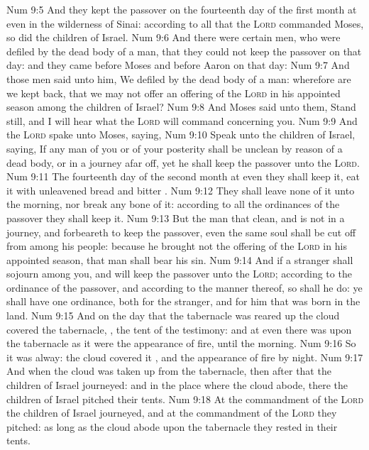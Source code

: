 \vs Num 9:5 And they kept the passover on the fourteenth day of the first month at even in the wilderness of Sinai: according to all that the \textsc{Lord} commanded Moses, so did the children of Israel.
\vs Num 9:6 And there were certain men, who were defiled by the dead body of a man, that they could not keep the passover on that day: and they came before Moses and before Aaron on that day:
\vs Num 9:7 And those men said unto him, We  defiled by the dead body of a man: wherefore are we kept back, that we may not offer an offering of the \textsc{Lord} in his appointed season among the children of Israel?
\vs Num 9:8 And Moses said unto them, Stand still, and I will hear what the \textsc{Lord} will command concerning you.
\vs Num 9:9 And the \textsc{Lord} spake unto Moses, saying,
\vs Num 9:10 Speak unto the children of Israel, saying, If any man of you or of your posterity shall be unclean by reason of a dead body, or  in a journey afar off, yet he shall keep the passover unto the \textsc{Lord}.
\vs Num 9:11 The fourteenth day of the second month at even they shall keep it,  eat it with unleavened bread and bitter .
\vs Num 9:12 They shall leave none of it unto the morning, nor break any bone of it: according to all the ordinances of the passover they shall keep it.
\vs Num 9:13 But the man that  clean, and is not in a journey, and forbeareth to keep the passover, even the same soul shall be cut off from among his people: because he brought not the offering of the \textsc{Lord} in his appointed season, that man shall bear his sin.
\vs Num 9:14 And if a stranger shall sojourn among you, and will keep the passover unto the \textsc{Lord}; according to the ordinance of the passover, and according to the manner thereof, so shall he do: ye shall have one ordinance, both for the stranger, and for him that was born in the land.
\vs Num 9:15 And on the day that the tabernacle was reared up the cloud covered the tabernacle, , the tent of the testimony: and at even there was upon the tabernacle as it were the appearance of fire, until the morning.
\vs Num 9:16 So it was alway: the cloud covered it , and the appearance of fire by night.
\vs Num 9:17 And when the cloud was taken up from the tabernacle, then after that the children of Israel journeyed: and in the place where the cloud abode, there the children of Israel pitched their tents.
\vs Num 9:18 At the commandment of the \textsc{Lord} the children of Israel journeyed, and at the commandment of the \textsc{Lord} they pitched: as long as the cloud abode upon the tabernacle they rested in their tents.
